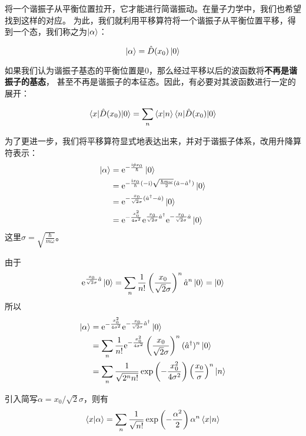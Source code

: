     将一个谐振子从平衡位置拉开，它才能进行简谐振动。在量子力学中，我们也希望找到这样的对应。
    为此，我们就利用平移算符将一个谐振子从平衡位置平移，得到一个态，我们称之为\(\ket{\alpha}\)：

    \[
        \ket{\alpha} = \hat{D}(x_0)\ket{0}
    \]

    如果我们认为谐振子基态的平衡位置是0，那么经过平移以后的波函数将\textbf{不再是谐振子的基态}，
    甚至不再是谐振子的本征态。因此，有必要对其波函数进行一定的展开：

    \[
        \braket{x | \hat{D}(x_0) | 0 } = \sum_n \braket{x | n} \braket{n | \hat{D}(x_0) | 0}
    \]

    为了更进一步，我们将平移算符显式地表达出来，并对于谐振子体系，改用升降算符表示：
    \[
        \begin{aligned}
        \ket{\alpha} &= \mathrm{e}^{-\frac{\mathrm{i} \hat{p} x_0}{\hbar}} \ket{0}
        \\ &= \mathrm{e}^{-\frac{\mathrm{i} x_0}{\hbar} (-\mathrm{i})\sqrt{\frac{\hbar m \omega}{2}} (\hat{a} - \hat{a}^\dagger)} \ket{0}
        \\ &= \mathrm{e}^{-\frac{x_0}{\sqrt{2}\sigma} (\hat{a}^\dagger - \hat{a})} \ket{0}
        \\ &= \mathrm{e}^{-\frac{x_0^2}{4\sigma^2}} \mathrm{e}^{\frac{x_0}{\sqrt{2}\sigma} \hat{a}^\dagger} \mathrm{e}^{-\frac{x_0}{\sqrt{2}\sigma} \hat{a}} \ket{0}
        \end{aligned}
    \]
    这里\(\sigma = \sqrt{\frac{\hbar}{m\omega}}\)。

    由于\[\mathrm{e}^{\frac{x_0}{\sqrt{2}\sigma} \hat{a}} \ket{0} = \sum_n \frac{1}{n!} \left(\frac{x_0}{\sqrt{2}\sigma}\right)^n \hat{a}^n \ket{0} = \ket{0} \]
    所以
    \[
        \begin{aligned}
        \ket{\alpha} &= \mathrm{e}^{-\frac{x_0^2}{4\sigma^2}} \mathrm{e}^{-\frac{x_0}{\sqrt{2}\sigma} \hat{a}^\dagger} \ket{0}
        \\ &= \sum_n \frac{1}{n!} \mathrm{e}^{-\frac{x_0^2}{4\sigma^2}} \left(\frac{x_0}{\sqrt{2}\sigma}\right)^n (\hat{a}^\dagger)^n \ket{0}
        \\ &= \sum_n \frac{1}{\sqrt{2^n n!}}\exp\left(-\frac{x_0^2}{4\sigma^2}\right) \left(\frac{x_0}{\sigma}\right)^n \ket{n}
        \end{aligned}
    \]

    引入简写\(\alpha = x_0 / \sqrt{2}\sigma\)，则有
    \begin{equation}\label{expansion}
        \braket{x | \alpha} = \sum_n \frac{1}{\sqrt{n!}}\exp\left(-\frac{\alpha^2}{2}\right) \alpha^n \braket{x|n}
    \end{equation}

